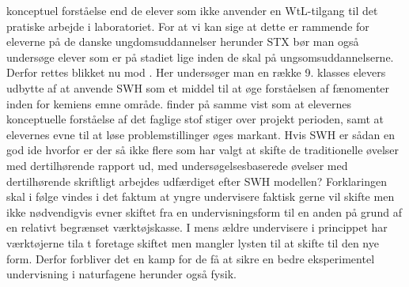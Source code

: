 konceptuel forståelse end de elever som ikke anvender en WtL-tilgang til det pratiske arbejde i laboratoriet. For at vi kan sige at dette er rammende for eleverne på de danske ungdomsuddannelser herunder STX bør man også undersøge elever som er på stadiet lige inden de skal på ungsomsuddannelserne. Derfor rettes blikket nu mod \citep{Kingir2013}. Her undersøger man en række 9. klasses elevers udbytte af at anvende SWH som et middel til at øge forståelsen af fænomenter inden for kemiens emne område. \citet{Kingir2013} finder på samme vist som \citet{Atasoy2013, Erkol2010} at elevernes konceptuelle forståelse af det faglige stof stiger over projekt perioden, samt at elevernes evne til at løse problemstillinger øges markant. Hvis SWH er sådan en god ide hvorfor er der så ikke flere som har valgt at skifte de traditionelle øvelser med dertilhørende rapport ud, med undersøgelsesbaserede øvelser med dertilhørende skriftligt arbejdes udfærdiget efter SWH modellen? Forklaringen skal i følge \citet{Burke2005,Keys1999,Krogh2016} vindes i det faktum at yngre undervisere faktisk gerne vil skifte men ikke nødvendigvis evner skiftet fra en undervisningsform til en anden på grund af en relativt begrænset værktøjskasse. I mens ældre undervisere i princippet har værktøjerne tila t foretage skiftet men mangler lysten til at skifte til den nye form. Derfor forbliver det en kamp for de få at sikre en bedre eksperimentel undervisning i naturfagene herunder også fysik.